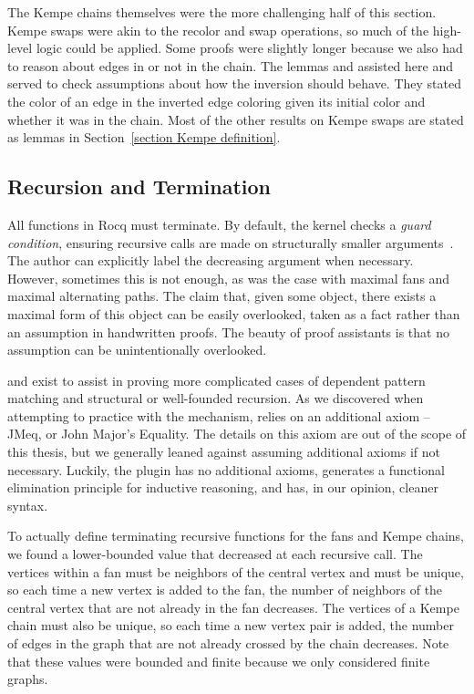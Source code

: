 The Kempe chains themselves were the more challenging half of this section. Kempe swaps were akin to the recolor and swap operations, so much of the high-level logic could be applied. Some proofs were slightly longer because we also had to reason about edges in or not in the chain. The lemmas  and  assisted here and served to check assumptions about how the inversion should behave. They stated the color of an edge in the inverted edge coloring given its initial color and whether it was in the chain. Most of the other results on Kempe swaps are stated as lemmas in Section~\ref{section Kempe definition}.

\subsection{Recursion and Termination}
All functions in Rocq must terminate. By default, the kernel checks a \textit{guard condition}, ensuring recursive calls are made on structurally smaller arguments~\cite{wf_doc}. The author can explicitly label the decreasing argument when necessary. However, sometimes this is not enough, as was the case with maximal fans and maximal alternating paths. The claim that, given some object, there exists a maximal form of this object can be easily overlooked, taken as a fact rather than an assumption in handwritten proofs. The beauty of proof assistants is that no assumption can be unintentionally overlooked.

 and  exist to assist in proving more complicated cases of dependent pattern matching and structural or well-founded recursion. As we discovered when attempting to practice with the  mechanism,  relies on an additional axiom -- JMeq, or John Major's Equality. The details on this axiom are out of the scope of this thesis, but we generally leaned against assuming additional axioms if not necessary. Luckily, the  plugin has no additional axioms, generates a functional elimination principle for inductive reasoning, and has, in our opinion, cleaner syntax. 

To actually define terminating recursive functions for the fans and Kempe chains, we found a lower-bounded value that decreased at each recursive call. The vertices within a fan must be neighbors of the central vertex and must be unique, so each time a new vertex is added to the fan, the number of neighbors of the central vertex that are not already in the fan decreases. The vertices of a Kempe chain must also be unique, so each time a new vertex pair is added, the number of edges in the graph that are not already crossed by the chain decreases. Note that these values were bounded and finite because we only considered finite graphs. 

